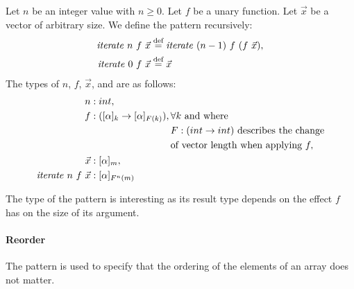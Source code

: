 \begin{definition}
  \label{definition:pattern:iterate}
  Let $n$ be an integer value with $n \geq 0$.
  Let $f$ be a unary function.
  Let $\vec{x}$ be a vector of arbitrary size.
  We define the \iterateN pattern recursively:
  \begin{align*}
    \iterateN\ n\ f\ \vec{x} &\eqdef \iterateN\ (n-1)\ f\ (f\ \vec{x}),\\
    \iterateN\ 0\ f\ \vec{x} &\eqdef \vec{x}
  \end{align*}
  The types of $n$, $f$, $\vec{x}$, and \iterateN are as follows:
  \begin{align*}
    n &: int,\\
    f &: ([\alpha]_k \rightarrow [\alpha]_{F(k)}), 
      \begin{aligned}[t]
        & \forall k \text{ and where } \\
        &F : (int\rightarrow int) \text{ describes the change}\\
        &\text{of vector length when applying } f,
      \end{aligned}\\
    \vec{x} &: [\alpha]_m,\\
    \text{\textit{iterate}}\ n\ f\ \vec{x} &: [\alpha]_{F^n(m)}
  \end{align*}
\end{definition}


\noindent
The type of the \iterateN pattern is interesting as its result type depends on the effect $f$ has on the size of its argument.


\paragraph{Reorder}
The \reorder pattern is used to specify that the ordering of the elements of an array does not matter.

